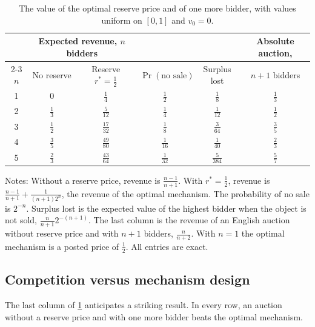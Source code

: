 \begin{table}[htbp]
\centering
\begin{threeparttable}
\caption{The value of the optimal reserve price and of one more bidder, with values uniform on $[0,1]$ and $v_0=0$.}\label{tab:14-reserve-uniform}
\small
\begin{tabular}{cccccc}
\toprule
 & \multicolumn{2}{c}{Expected revenue, $n$ bidders} & & & Absolute auction,\\
\cmidrule(lr){2-3}
$n$ & No reserve & Reserve $r^*=\frac12$ & $\Pr(\text{no sale})$ & Surplus lost & $n+1$ bidders\\
\midrule
1 & $0$ & $\frac{1}{4}$ & $\frac{1}{2}$ & $\frac{1}{8}$ & $\frac{1}{3}$\\[3pt]
2 & $\frac{1}{3}$ & $\frac{5}{12}$ & $\frac{1}{4}$ & $\frac{1}{12}$ & $\frac{1}{2}$\\[3pt]
3 & $\frac{1}{2}$ & $\frac{17}{32}$ & $\frac{1}{8}$ & $\frac{3}{64}$ & $\frac{3}{5}$\\[3pt]
4 & $\frac{3}{5}$ & $\frac{49}{80}$ & $\frac{1}{16}$ & $\frac{1}{40}$ & $\frac{2}{3}$\\[3pt]
5 & $\frac{2}{3}$ & $\frac{43}{64}$ & $\frac{1}{32}$ & $\frac{5}{384}$ & $\frac{5}{7}$\\
\bottomrule
\end{tabular}
\begin{tablenotes}
\footnotesize
\item Notes: Without a reserve price, revenue is $\frac{n-1}{n+1}$. With $r^*=\frac12$, revenue is $\frac{n-1}{n+1}+\frac{1}{(n+1)2^n}$, the revenue of the optimal mechanism. The probability of no sale is $2^{-n}$. Surplus lost is the expected value of the highest bidder when the object is not sold, $\frac{n}{n+1}2^{-(n+1)}$. The last column is the revenue of an English auction without reserve price and with $n+1$ bidders, $\frac{n}{n+2}$. With $n=1$ the optimal mechanism is a posted price of $\frac12$. All entries are exact.
\end{tablenotes}
\end{threeparttable}
\end{table}

\subsection{Competition versus mechanism design}\label{sec:14-optimal-bk}

The last column of \cref{tab:14-reserve-uniform} anticipates a striking result. In every row, an auction without a reserve price and with one more bidder beats the optimal mechanism.

